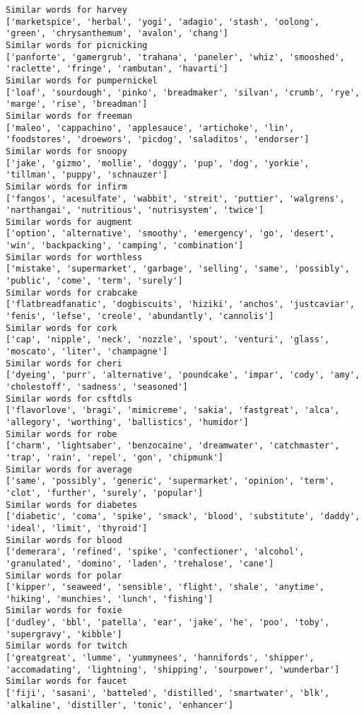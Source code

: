 \documentclass[11pt]{article}
\begin{document}
\begin{Verbatim}[commandchars=\\\{\}]
Similar words for harvey
['marketspice', 'herbal', 'yogi', 'adagio', 'stash', 'oolong', 'green', 'chrysanthemum', 'avalon', 'chang']
Similar words for picnicking
['panforte', 'gamergrub', 'trahana', 'paneler', 'whiz', 'smooshed', 'raclette', 'fringe', 'rambutan', 'havarti']
Similar words for pumpernickel
['loaf', 'sourdough', 'pinko', 'breadmaker', 'silvan', 'crumb', 'rye', 'marge', 'rise', 'breadman']
Similar words for freeman
['maleo', 'cappachino', 'applesauce', 'artichoke', 'lin', 'foodstores', 'droewors', 'picdog', 'saladitos', 'endorser']
Similar words for snoopy
['jake', 'gizmo', 'mollie', 'doggy', 'pup', 'dog', 'yorkie', 'tillman', 'puppy', 'schnauzer']
Similar words for infirm
['fangos', 'acesulfate', 'wabbit', 'streit', 'puttier', 'walgrens', 'narthangai', 'nutritious', 'nutrisystem', 'twice']
Similar words for augment
['option', 'alternative', 'smoothy', 'emergency', 'go', 'desert', 'win', 'backpacking', 'camping', 'combination']
Similar words for worthless
['mistake', 'supermarket', 'garbage', 'selling', 'same', 'possibly', 'public', 'come', 'term', 'surely']
Similar words for crabcake
['flatbreadfanatic', 'dogbiscuits', 'hiziki', 'anchos', 'justcaviar', 'fenis', 'lefse', 'creole', 'abundantly', 'cannolis']
Similar words for cork
['cap', 'nipple', 'neck', 'nozzle', 'spout', 'venturi', 'glass', 'moscato', 'liter', 'champagne']
Similar words for cheri
['dyeing', 'purr', 'alternative', 'poundcake', 'impar', 'cody', 'amy', 'cholestoff', 'sadness', 'seasoned']
Similar words for csftdls
['flavorlove', 'bragi', 'mimicreme', 'sakia', 'fastgreat', 'alca', 'allegory', 'worthing', 'ballistics', 'humidor']
Similar words for robe
['charm', 'lightsaber', 'benzocaine', 'dreamwater', 'catchmaster', 'trap', 'rain', 'repel', 'gon', 'chipmunk']
Similar words for average
['same', 'possibly', 'generic', 'supermarket', 'opinion', 'term', 'clot', 'further', 'surely', 'popular']
Similar words for diabetes
['diabetic', 'coma', 'spike', 'smack', 'blood', 'substitute', 'daddy', 'ideal', 'limit', 'thyroid']
Similar words for blood
['demerara', 'refined', 'spike', 'confectioner', 'alcohol', 'granulated', 'domino', 'laden', 'trehalose', 'cane']
Similar words for polar
['kipper', 'seaweed', 'sensible', 'flight', 'shale', 'anytime', 'hiking', 'munchies', 'lunch', 'fishing']
Similar words for foxie
['dudley', 'bbl', 'patella', 'ear', 'jake', 'he', 'poo', 'toby', 'supergravy', 'kibble']
Similar words for twitch
['greatgreat', 'lumme', 'yummynees', 'hannifords', 'shipper', 'accomadating', 'lightning', 'shipping', 'sourpower', 'wunderbar']
Similar words for faucet
['fiji', 'sasani', 'batteled', 'distilled', 'smartwater', 'blk', 'alkaline', 'distiller', 'tonic', 'enhancer']

\end{Verbatim}
\end{document}
